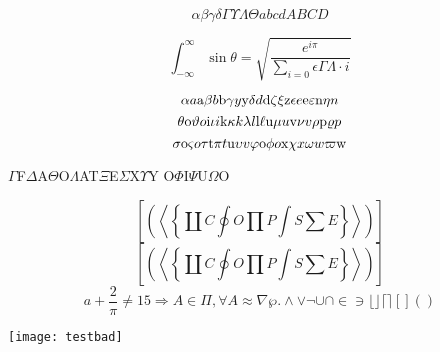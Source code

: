

\[
\alpha\beta\gamma\delta \Gamma\Upsilon\Lambda\Theta abcd ABCD
\]

\[
\int_{-\infty}^{\infty}\sin\theta =
\sqrt{\frac{e^{i\pi}}{\sum_{i=0}{\epsilon}\Gamma\Lambda\cdot i}}
\]

\[
\alpha a \hbox{a} \beta b \hbox{b} \gamma y \hbox{y} \delta d \hbox{d} \zeta \xi
\hbox{z} \epsilon e \hbox{e} \varepsilon \hbox{n} \eta n
\]
\[
\theta \hbox{o} \vartheta o \hbox{i} \iota i \hbox{k} \kappa k \lambda l
\hbox{l} \ell \hbox{u} \mu u \hbox{v} \nu v \rho \hbox{p} \varrho p
\]
\[
\sigma \hbox{o} \varsigma o \tau \hbox{t} \pi t \hbox{u} \upsilon v \varphi
\hbox{o} \phi o \hbox{x} \chi x \omega w \varpi \hbox{w}
\]
\begin{center}
$\Gamma$F$\Delta$A$\Theta$O$\Lambda$AT$\Xi$E$\Sigma$X$\Upsilon$Y
O$\Phi$I$\Psi$U$\Omega$O
\end{center}
\[
\textstyle
\left[\left(\left\langle\left\{
\coprod C \oint O \prod P \int S\sum E
\right\}\right\rangle\right)\right]
\]
\[
\left[\left(\left\langle\left\{
\coprod C \oint O \prod P \int S\sum E
\right\}\right\rangle\right)\right]
\]
\[
a + \frac{2}{\pi} \ne 15 \Longrightarrow A \in \Pi, \forall A \approx \nabla\wp.
\wedge \vee \neg \cup \cap \in \ni \lfloor \rfloor \lceil \rceil [ ] ( )
\]

\noindent\texttt{[image: testbad]}


